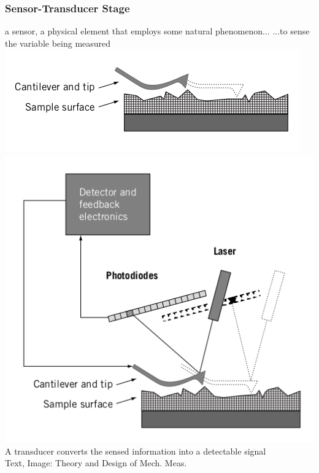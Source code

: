 \documentclass[fleqn]{beamer} %
\begin{document}
\begin{frame}
\frametitle{Sensor-Transducer Stage}
a {\PR sensor}, a physical element that employs some natural phenomenon... ...to sense the variable being measured
\includegraphics[scale=0.20]{sensor_stage.png}\includegraphics[scale=0.20]{sensor_transducer_stage}\\

A {\GR transducer} converts the sensed information into a detectable signal \\
{\tiny Text, Image: Theory and Design of Mech. Meas.}
\end{frame}
\end{document}
